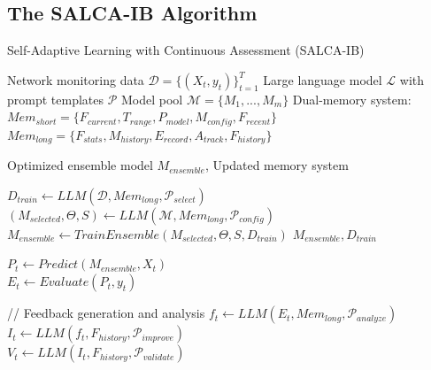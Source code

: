 \documentclass[conference]{IEEEtran}
\begin{document}
\subsection{The SALCA-IB Algorithm}
\begin{algorithm}[H]
    \caption{Self-Adaptive Learning with Continuous Assessment (SALCA-IB)}
    \label{alg:salca-ib}
    \begin{algorithmic}[1]
    \Require
        \Statex \hspace{-1em}Network monitoring data $\mathcal{D} = \{(X_t, y_t)\}_{t=1}^T$
        \Statex \hspace{-1em}Large language model $\mathcal{L}$ with prompt templates $\mathcal{P}$
        \Statex \hspace{-1em}Model pool $\mathcal{M} = \{M_1, ..., M_m\}$
        \Statex \hspace{-1em}Dual-memory system: $Mem_{short} = \{F_{current}, T_{range}, P_{model}, M_{config}, F_{recent}\}$
        \Statex \hspace{-1em}\hspace{3.6em}$Mem_{long} = \{F_{stats}, M_{history}, E_{record}, A_{track}, F_{history}\}$
    
    \Ensure Optimized ensemble model $M_{ensemble}$, Updated memory system
    
    \vspace{0.5em}
        \State $D_{train} \gets LLM(\mathcal{D}, Mem_{long}, \mathcal{P}_{select})$  \\
        \State $(M_{selected}, \Theta, S) \gets LLM(\mathcal{M}, Mem_{long}, \mathcal{P}_{config})$  \\
        \State $M_{ensemble} \gets TrainEnsemble(M_{selected}, \Theta, S, D_{train})$
        \State \Return $M_{ensemble}, D_{train}$
    \EndFunction
    
            \State $P_t \gets Predict(M_{ensemble}, X_t)$  \\
            \State $E_t \gets Evaluate(P_t, y_t)$  \\
            
            \State // Feedback generation and analysis
            \State $f_t \gets LLM(E_t, Mem_{long}, \mathcal{P}_{analyze})$  \\
            \State $I_t \gets LLM(f_t, F_{history}, \mathcal{P}_{improve})$  \\
            \State $V_t \gets LLM(I_t, F_{history}, \mathcal{P}_{validate})$  \\
            

\end{algorithmic}
\end{algorithm}
\end{document}
